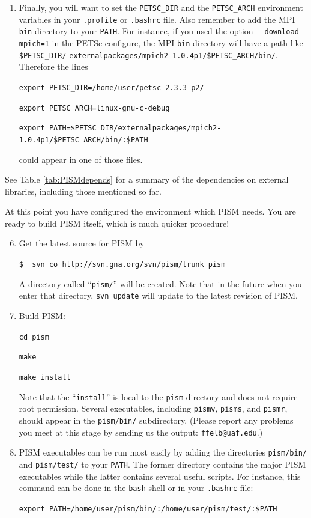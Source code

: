 \documentclass[11pt,final]{amsart}
\begin{document}
\begin{enumerate}
\begin{enumerate}
\item Finally, you will want to set the \verb|PETSC_DIR| and the \verb|PETSC_ARCH| environment variables in your \verb|.profile| or \verb|.bashrc| file.  Also remember to add the MPI \verb|bin| directory to your \verb|PATH|.  For instance, if you used the option \verb|--download-mpich=1| in the PETSc configure, the MPI \verb|bin| directory will have a path like \verb|$PETSC_DIR/| \verb|externalpackages/mpich2-1.0.4p1/$PETSC_ARCH/bin/|.  Therefore the lines 

\small
\verb|export PETSC_DIR=/home/user/petsc-2.3.3-p2/|

\verb|export PETSC_ARCH=linux-gnu-c-debug|

\verb|export PATH=$PETSC_DIR/externalpackages/mpich2-1.0.4p1/$PETSC_ARCH/bin/:$PATH|
\normalsize

\noindent could appear in one of those files.
\end{enumerate}
\end{enumerate}

\bigskip
See Table \ref{tab:PISMdepends} for a summary of the dependencies on external libraries, including those mentioned so far.

\medskip
At this point you have configured the environment which PISM needs.  You are ready to build PISM itself, which is much quicker procedure!
\bigskip

\begin{enumerate}\setcounter{enumi}{5}
\item \label{getPISMstep} Get the latest source for PISM by

\verb|$  svn co http://svn.gna.org/svn/pism/trunk pism|

\noindent A directory called ``\verb|pism/|'' will be created.  Note that in the future when you enter that directory, \verb|svn update| will update to the latest revision of PISM.

\item Build PISM:

\verb|cd pism|

\verb|make|

\verb|make install|

\noindent  Note that the ``\verb|install|'' is local to the \verb|pism| directory and does not require root permission.  Several executables, including \verb|pismv|, \verb|pisms|, and \verb|pismr|, should appear in the \verb|pism/bin/| subdirectory.  (Please report any problems you meet at this stage by sending us the output: \verb|ffelb@uaf.edu|.)  

\item PISM executables can be run most easily by adding the directories \verb|pism/bin/| and \verb|pism/test/| to your \verb|PATH|.  The former directory contains the major PISM executables while the latter contains several useful scripts.  For instance, this command can be done in the \verb|bash| shell or in your \verb|.bashrc| file:

\verb|export PATH=/home/user/pism/bin/:/home/user/pism/test/:$PATH|
\end{enumerate}
\end{document}
